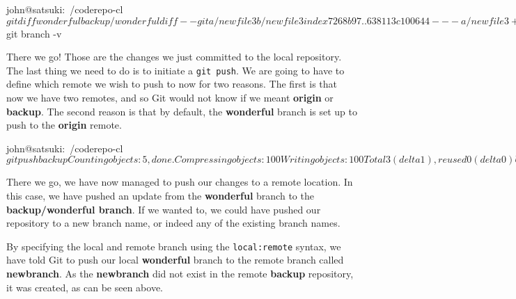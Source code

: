 \begin{code}
john@satsuki:~/coderepo-cl$ git diff wonderful backup/wonderful
diff --git a/newfile3 b/newfile3
index 7268b97..638113c 100644
--- a/newfile3
+++ b/newfile3
@@ -1,2 +1 @@
 These changes are in the origin
-This is another update to newfile3
john@satsuki:~/coderepo-cl$ git branch -v
\end{code}

There we go! Those are the changes we just committed to the local repository.
The last thing we need to do is to initiate a \texttt{git push}.
We are going to have to define which remote we wish to push to now for two reasons.
The first is that now we have two remotes, and so Git would not know if we meant \textbf{origin} or \textbf{backup}.
The second reason is that by default, the \textbf{wonderful} branch is set up to push to the \textbf{origin} remote.

\begin{code}
john@satsuki:~/coderepo-cl$ git push backup
Counting objects: 5, done.
Compressing objects: 100%
Writing objects: 100%
Total 3 (delta 1), reused 0 (delta 0)
Unpacking objects: 100%
To /home/john/coderepo-bk
   1c3206a..dbf1e9a  wonderful -> wonderful
john@satsuki:~/coderepo-cl$
\end{code}

There we go, we have now managed to push our changes to a remote location.
In this case, we have pushed an update from the \textbf{wonderful} branch to the \textbf{backup/wonderful branch}.
If we wanted to, we could have pushed our repository to a new branch name, or indeed any of the existing branch names.


By specifying the local and remote branch using the \texttt{local:remote} syntax, we have told Git to push our local \textbf{wonderful} branch to the remote branch called \textbf{newbranch}.
As the \textbf{newbranch} did not exist in the remote \textbf{backup} repository, it was created, as can be seen above.

